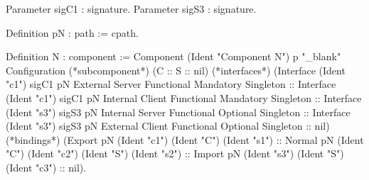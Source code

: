 Parameter sigC1 : signature.
Parameter sigS3 : signature.

Definition pN : path := cpath.

Definition N : component :=
  Component (Ident "Component N") p "_blank" Configuration
   (*subcomponent*)
   (C :: S :: nil)
   (*interfaces*)
   (Interface (Ident "c1") sigC1 pN
               External Server Functional Mandatory Singleton ::
    Interface (Ident "c1") sigC1 pN
               Internal Client Functional Mandatory Singleton :: 
    Interface (Ident "s3") sigS3 pN
               Internal Server Functional Optional Singleton   ::
    Interface (Ident "s3") sigS3 pN
              External Client Functional Optional Singleton   :: nil) 
    (*bindings*)
    (Export pN (Ident "c1") (Ident "C") (Ident "s1") ::
     Normal pN (Ident "C") (Ident "c2") (Ident "S") (Ident "s2") ::
     Import pN (Ident "s3") (Ident "S") (Ident "c3") :: nil).